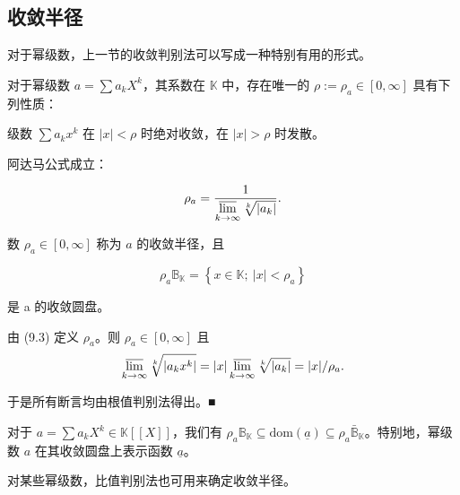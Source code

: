\subsection*{收敛半径}

对于幂级数，上一节的收敛判别法可以写成一种特别有用的形式。

\begin{theorem}

对于幂级数  $ a = \sum a_k X^k $，其系数在  $ \mathbb{K} $ 中，存在唯一的  $ \rho := \rho_a \in [0, \infty] $ 具有下列性质：

\begin{subitems}
\item

级数  $ \sum a_k x^k $ 在  $ |x| < \rho $ 时绝对收敛，在  $ |x| > \rho $ 时发散。

\item

阿达马公式成立：

\begin{equation}
\rho_{a}=\frac{1}{\varlimsup\limits_{k\to\infty}\sqrt[k]{|a_{k}|}}.
\end{equation}

数 $ \rho_a \in [0, \infty] $ 称为  $ a $ 的收敛半径，且

\[
\rho_{a}\mathbb{B}_{\mathbb{K}}=\left\{x\in\mathbb{K};\ |x|<\rho_{a}\right\}
\]

是 a 的收敛圆盘。

\proofhead
由 (9.3) 定义  $ \rho_a $。则  $ \rho_a \in [0, \infty] $ 且
\[
\varlimsup_{k\to\infty}\sqrt[k]{\vert a_{k} x^{k}\vert}=\vert x\vert\varlimsup_{k\to\infty}\sqrt[k]{\vert a_{k}\vert}=\vert x\vert/\rho_{a}.
\]

于是所有断言均由根值判别法得出。■

\end{subitems}

\end{theorem}

\begin{corollary}

对于  $ a = \sum a_k X^k \in \mathbb{K}[\![X]\!] $，我们有  $ \rho_a \mathbb{B}_{\mathbb{K}} \subseteq \text{dom}(\underline{a}) \subseteq \rho_a \bar{\mathbb{B}}_{\mathbb{K}} $。特别地，幂级数  $ a $ 在其收敛圆盘上表示函数  $ \underline{a} $。

对某些幂级数，比值判别法也可用来确定收敛半径。

\end{corollary}

